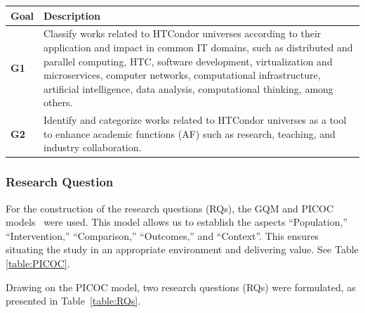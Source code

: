 \begin{table}
	{\begin{tabular}{p{1cm}p{6.8cm}} \toprule
			\textbf{Goal} & \textbf{Description}                                                                                                                                                                                                                                                                                                                                 \\
			\midrule
			\textbf{G1}   & Classify works related to HTCondor universes according to their application and impact in common IT domains, such as distributed and parallel computing, HTC, software development, virtualization and microservices, computer networks, computational infrastructure, artificial intelligence, data analysis, computational thinking, among others. \\
			\textbf{G2}   & Identify and categorize works related to HTCondor universes as a tool to enhance academic functions (AF) such as research, teaching, and industry collaboration.                                                                                                                                                                                     \\
			\bottomrule
		\end{tabular}}
	\label{table:Goals}
\end{table}


\subsubsection{Research Question}
For the construction of the research questions (RQs), the GQM and PICOC models~\cite{Needleman20026, Petticrew2008systematic} were used. This model allows us to establish the aspects ``Population,'' ``Intervention,'' ``Comparison,'' ``Outcomes,'' and ``Context''. This ensures situating the study in an appropriate environment and delivering value. See Table \ref{table:PICOC}.

Drawing on the PICOC model, two research questions (RQs) were formulated, as presented in Table~\ref{table:RQs}.

